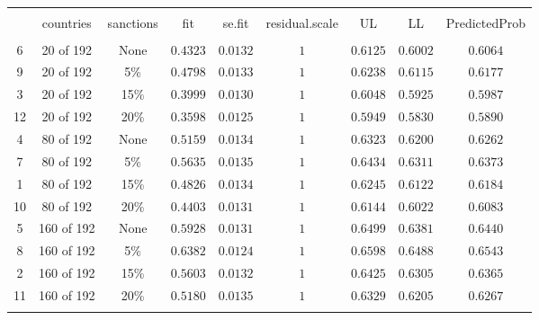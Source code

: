 
\begin{table}[!htbp] \centering 
  \caption{} 
  \label{tab:pred} 
\begin{tabular}{@{\extracolsep{5pt}} ccccccccc} 
\\[-1.8ex]\hline 
\hline \\[-1.8ex] 
 & countries & sanctions & fit & se.fit & residual.scale & UL & LL & PredictedProb \\ 
\hline \\[-1.8ex] 
6 & 20 of 192 & None & $0.4323$ & $0.0132$ & $1$ & $0.6125$ & $0.6002$ & $0.6064$ \\ 
9 & 20 of 192 & 5\% & $0.4798$ & $0.0133$ & $1$ & $0.6238$ & $0.6115$ & $0.6177$ \\ 
3 & 20 of 192 & 15\% & $0.3999$ & $0.0130$ & $1$ & $0.6048$ & $0.5925$ & $0.5987$ \\ 
12 & 20 of 192 & 20\% & $0.3598$ & $0.0125$ & $1$ & $0.5949$ & $0.5830$ & $0.5890$ \\ 
4 & 80 of 192 & None & $0.5159$ & $0.0134$ & $1$ & $0.6323$ & $0.6200$ & $0.6262$ \\ 
7 & 80 of 192 & 5\% & $0.5635$ & $0.0135$ & $1$ & $0.6434$ & $0.6311$ & $0.6373$ \\ 
1 & 80 of 192 & 15\% & $0.4826$ & $0.0134$ & $1$ & $0.6245$ & $0.6122$ & $0.6184$ \\ 
10 & 80 of 192 & 20\% & $0.4403$ & $0.0131$ & $1$ & $0.6144$ & $0.6022$ & $0.6083$ \\ 
5 & 160 of 192 & None & $0.5928$ & $0.0131$ & $1$ & $0.6499$ & $0.6381$ & $0.6440$ \\ 
8 & 160 of 192 & 5\% & $0.6382$ & $0.0124$ & $1$ & $0.6598$ & $0.6488$ & $0.6543$ \\ 
2 & 160 of 192 & 15\% & $0.5603$ & $0.0132$ & $1$ & $0.6425$ & $0.6305$ & $0.6365$ \\ 
11 & 160 of 192 & 20\% & $0.5180$ & $0.0135$ & $1$ & $0.6329$ & $0.6205$ & $0.6267$ \\ 
\hline \\[-1.8ex] 
\end{tabular} 
\end{table}  
